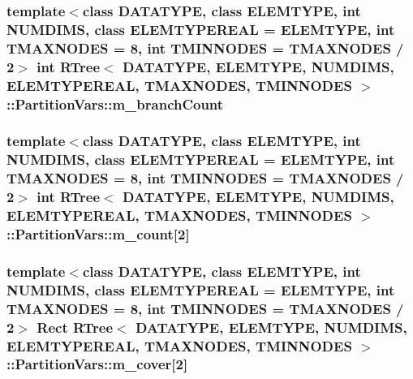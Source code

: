 \hypertarget{structRTree_1_1PartitionVars_abaaed8bac2d71bc6debadc5136078a0b}{
\subsubsection[{m\-\_\-branch\-Count}]{\setlength{\rightskip}{0pt plus 5cm}template$<$class D\-A\-T\-A\-T\-Y\-P\-E, class E\-L\-E\-M\-T\-Y\-P\-E, int N\-U\-M\-D\-I\-M\-S, class E\-L\-E\-M\-T\-Y\-P\-E\-R\-E\-A\-L = E\-L\-E\-M\-T\-Y\-P\-E, int T\-M\-A\-X\-N\-O\-D\-E\-S = 8, int T\-M\-I\-N\-N\-O\-D\-E\-S = T\-M\-A\-X\-N\-O\-D\-E\-S / 2$>$ int {\bf R\-Tree}$<$ D\-A\-T\-A\-T\-Y\-P\-E, E\-L\-E\-M\-T\-Y\-P\-E, N\-U\-M\-D\-I\-M\-S, E\-L\-E\-M\-T\-Y\-P\-E\-R\-E\-A\-L, T\-M\-A\-X\-N\-O\-D\-E\-S, T\-M\-I\-N\-N\-O\-D\-E\-S $>$\-::Partition\-Vars\-::m\-\_\-branch\-Count}}\label{structRTree_1_1PartitionVars_abaaed8bac2d71bc6debadc5136078a0b}
\hypertarget{structRTree_1_1PartitionVars_acbf70d46606cebe104471635d1c06c56}{
\subsubsection[{m\-\_\-count}]{\setlength{\rightskip}{0pt plus 5cm}template$<$class D\-A\-T\-A\-T\-Y\-P\-E, class E\-L\-E\-M\-T\-Y\-P\-E, int N\-U\-M\-D\-I\-M\-S, class E\-L\-E\-M\-T\-Y\-P\-E\-R\-E\-A\-L = E\-L\-E\-M\-T\-Y\-P\-E, int T\-M\-A\-X\-N\-O\-D\-E\-S = 8, int T\-M\-I\-N\-N\-O\-D\-E\-S = T\-M\-A\-X\-N\-O\-D\-E\-S / 2$>$ int {\bf R\-Tree}$<$ D\-A\-T\-A\-T\-Y\-P\-E, E\-L\-E\-M\-T\-Y\-P\-E, N\-U\-M\-D\-I\-M\-S, E\-L\-E\-M\-T\-Y\-P\-E\-R\-E\-A\-L, T\-M\-A\-X\-N\-O\-D\-E\-S, T\-M\-I\-N\-N\-O\-D\-E\-S $>$\-::Partition\-Vars\-::m\-\_\-count\mbox{[}2\mbox{]}}}\label{structRTree_1_1PartitionVars_acbf70d46606cebe104471635d1c06c56}
\hypertarget{structRTree_1_1PartitionVars_ab59894eefb7f3f6cc7254bbc90cd2570}{
\subsubsection[{m\-\_\-cover}]{\setlength{\rightskip}{0pt plus 5cm}template$<$class D\-A\-T\-A\-T\-Y\-P\-E, class E\-L\-E\-M\-T\-Y\-P\-E, int N\-U\-M\-D\-I\-M\-S, class E\-L\-E\-M\-T\-Y\-P\-E\-R\-E\-A\-L = E\-L\-E\-M\-T\-Y\-P\-E, int T\-M\-A\-X\-N\-O\-D\-E\-S = 8, int T\-M\-I\-N\-N\-O\-D\-E\-S = T\-M\-A\-X\-N\-O\-D\-E\-S / 2$>$ {\bf Rect} {\bf R\-Tree}$<$ D\-A\-T\-A\-T\-Y\-P\-E, E\-L\-E\-M\-T\-Y\-P\-E, N\-U\-M\-D\-I\-M\-S, E\-L\-E\-M\-T\-Y\-P\-E\-R\-E\-A\-L, T\-M\-A\-X\-N\-O\-D\-E\-S, T\-M\-I\-N\-N\-O\-D\-E\-S $>$\-::Partition\-Vars\-::m\-\_\-cover\mbox{[}2\mbox{]}}}\label{structRTree_1_1PartitionVars_ab59894eefb7f3f6cc7254bbc90cd2570}
